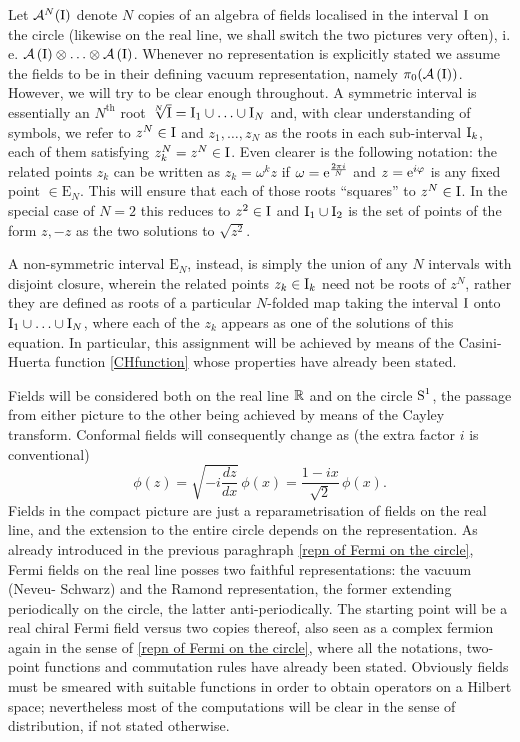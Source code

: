  \bigskip 
 Let $\mathcal{A}^N(\textrm{I})$ denote $N$ copies of an algebra 
 of fields localised in the interval $\textrm{I}$ on the circle 
 (likewise on the real line, we shall switch the two pictures 
 very often), i. e. $\mathcal{A}\left(\textrm{I}\right)\otimes\ldots\otimes\mathcal{A}\left(\textrm{I}\right)$.
 Whenever no representation is explicitly stated we assume 
 the fields to be in their defining vacuum representation, namely 
 $\pi_0(\mathcal{A}\left(\textrm{I}\right))$. However, we will try to be clear enough 
 throughout. A symmetric interval is essentially an 
 $N^{\textrm{th}}$ root $\sqrt[N]{\textrm{I}}=\textrm{I}_1\cup\ldots\cup
 \textrm{I}_N$ and, with clear understanding of symbols, we 
 refer to $z^N\in\textrm{I}$ and $z_1,\ldots,z_N$ as the roots 
 in each sub-interval $\textrm{I}_k$, each of them satisfying 
 $z_k^N=z^N\in\textrm{I}$. Even clearer is the following 
 notation: the related points $z_k$ can be written 
 as $z_k=\omega^k z$ if $\omega=\operatorname{e}^{\frac{2\pi i}{N}}$
 and $z=\operatorname{e}^{i\varphi}$ is any fixed point $\in \textrm{E}_N$.
 This will ensure that each of those roots 
 ``squares'' to $z^N\in\textrm{I}$. In the special case of $N=2$
 this reduces to $z^2\in\textrm{I}$ and $\textrm{I}_1\cup\textrm{I}_2$ is the 
 set of points of the form $z,-z$ as the two solutions 
 to $\sqrt{z^2}$.
 
 A non-symmetric interval $\textrm{E}_N$, instead, 
 is simply the union of any $N$ intervals with disjoint closure, 
 wherein the related points $z_k\in\textrm{I}_k$ need not be 
 roots of $z^N$, rather they are defined as roots 
 of a particular $N$-folded map taking the interval 
 $\textrm{I}$ onto $\textrm{I}_1\cup\ldots\cup\textrm{I}_N$, where each of the 
 $z_k$ appears as one of the solutions of this equation.
 In particular, this assignment will be achieved by means 
 of the Casini-Huerta function \eqref{CHfunction} whose 
 properties have already been stated.  
 
 \bigskip 
 Fields will be considered both on the real line $\mathbb{R}$ and
 on the circle $\textrm{S}^1$, the passage from either picture to
 the other being achieved by means of the Cayley
 transform. Conformal fields will consequently change 
 as (the extra factor $i$ is conventional)
 \[
 \phi(z)=\sqrt{-i\frac{dz}{dx}}\,\phi(x)=
 \frac{1-ix}{\sqrt{2}}\,\phi(x).
 \]
 Fields in the compact picture are just a reparametrisation
 of fields on the real line, and the extension to the 
 entire circle depends on the representation. As already 
 introduced in the previous paraghraph 
 \ref{repn of Fermi on the circle}, Fermi fields on the real 
 line posses two faithful representations: the vacuum (Neveu-
 Schwarz) and the Ramond representation, the former extending 
 periodically on the circle, the latter anti-periodically.
 The starting point will be a real chiral Fermi field versus 
 two copies thereof, also seen as a complex fermion again in the 
 sense of \ref{repn of Fermi on the circle}, where all the notations,
 two-point functions and commutation rules have already been 
 stated. Obviously fields must be smeared with suitable 
 functions in order to obtain operators on a Hilbert space;
 nevertheless most of the computations will be clear in the 
 sense of distribution, if not stated otherwise.
 
